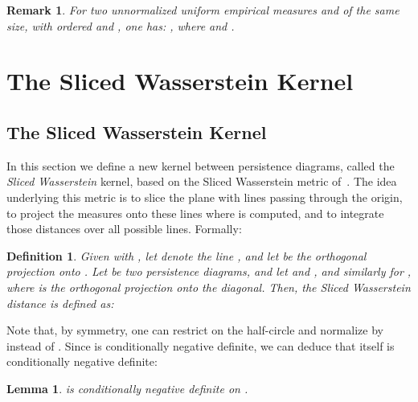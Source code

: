 \documentclass[11pt]{article}
\newtheorem{lem}[thm]{Lemma}
\newtheorem{defin}[thm]{Definition}
\newtheorem{rem}[thm]{Remark}
\begin{document}
\begin{rem} For two unnormalized uniform empirical measures 
 and  of the same size, with ordered 
 and , one has:
, where  and .
\end{rem}









\section{The Sliced Wasserstein Kernel}

\subsection{The Sliced Wasserstein Kernel}

In this section we define a new kernel between persistence diagrams, called the {\em Sliced Wasserstein} kernel,
based on the Sliced Wasserstein metric of~\cite{Rabin11}. The idea underlying this
metric is to slice the plane with lines passing through the origin, to
project the measures onto these lines where  is computed, 
and to integrate those distances over all possible lines.  Formally:

\begin{defin}  
Given  with , let  denote the line , and
let  be the orthogonal projection onto .
Let  be two persistence diagrams, and let  and 
,
and similarly for , where  is the orthogonal projection onto the diagonal.
Then, the {\em Sliced Wasserstein distance} 
is defined as:

\end{defin} 



























Note that, by symmetry, one can restrict on the half-circle  and normalize by  instead of .
Since  is conditionally negative definite,
we can deduce that  itself is conditionally negative definite:

\begin{lem}\label{lem:nd}
 is conditionally negative definite on .
\end{lem}
\end{document}
